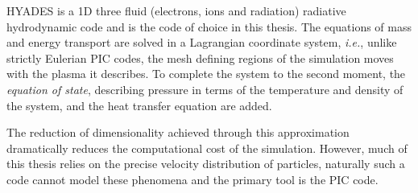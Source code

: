 HYADES is a 1D three fluid (electrons, ions and radiation) radiative hydrodynamic code \cite{larsenHYADESPlasmaHydrodynamics1994} and is the code of choice in this thesis. The equations of mass and energy transport are solved in a Lagrangian coordinate system, \textit{i.e.}, unlike strictly Eulerian PIC codes, the mesh defining regions of the simulation moves with the plasma it describes. To complete the system to the second moment, the \textit{equation of state}, describing pressure in terms of the temperature and density of the system, and the heat transfer equation are added. 


The reduction of dimensionality achieved through this approximation dramatically reduces the computational cost of the simulation. However, much of this thesis relies on the precise velocity distribution of particles, naturally such a code cannot model these phenomena and the primary tool is the PIC code.


